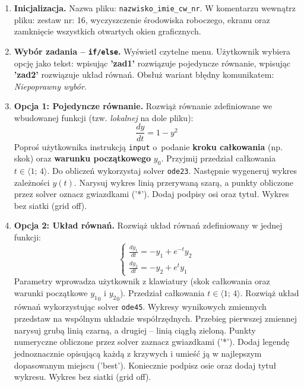 \documentclass[a4paper,11pt]{article}
\begin{document}
\begin{enumerate}[leftmargin=*, label=\textbf{\arabic*.}, itemsep=2pt]

  \item \textbf{Inicjalizacja.}
    Nazwa pliku: \texttt{nazwisko\_imie\_cw\_nr}. W komentarzu wewnątrz pliku: zestaw nr: 16, wyczyszczenie środowiska roboczego, ekranu oraz zamknięcie wszystkich otwartych okien graficznych.

  \item \textbf{Wybór zadania -- \texttt{if/else}.}
    Wyświetl czytelne menu. Użytkownik wybiera opcję jako tekst: wpisując \textbf{'zad1'} rozwiązuje pojedyncze równanie, wpisując \textbf{'zad2'} rozwiązuje układ równań. Obsłuż wariant błędny komunikatem: \textit{Niepoprawny wybór}.

  \item \textbf{Opcja 1: Pojedyncze równanie.}
    Rozwiąż równanie zdefiniowane we wbudowanej funkcji (tzw. \textit{lokalnej} na dole pliku):
    \[ \frac{dy}{dt} = 1 - y^2 \]
    Poproś użytkownika instrukcją \texttt{input} o~podanie \textbf{kroku całkowania} (np. skok) oraz \textbf{warunku początkowego} $y_0$. Przyjmij przedział całkowania $t \in \langle 1;\,4 \rangle$.
    Do obliczeń wykorzystaj solver \texttt{ode23}. Następnie wygeneruj wykres zależności $y(t)$. Narysuj wykres linią przerywaną szarą, a punkty obliczone przez solver oznacz gwiazdkami ('*'). Dodaj podpisy osi oraz tytuł. Wykres bez siatki (grid off).

  \item \textbf{Opcja 2: Układ równań.}
    Rozwiąż układ równań zdefiniowany w jednej funkcji:\\[-0.5em]
    \[
    \begin{cases}
      \frac{dy_1}{dt} = -y_1 + e^{-t}y_2 \\
      \frac{dy_2}{dt} = -y_2 + e^{t}y_1
    \end{cases}
    \]
    Parametry wprowadza użytkownik z klawiatury (skok całkowania oraz warunki początkowe $ {y_1}_{0} $ i $ {y_2}_{0} $). Przedział całkowania $t \in \langle 1;\,4 \rangle$.
    Rozwiąż układ równań wykorzystując solver \texttt{ode45}. Wykresy wynikowych zmiennych przedstaw na wspólnym układzie współrzędnych. Przebieg pierwszej zmiennej narysuj grubą linią czarną, a drugiej -- linią ciągłą zieloną. Punkty numeryczne obliczone przez solver zaznacz gwiazdkami ('*'). Dodaj legendę jednoznacznie opisującą każdą z krzywych i umieść ją w najlepszym dopasowanym miejscu ('best'). Koniecznie podpisz osie oraz dodaj tytuł wykresu. Wykres bez siatki (grid off).

\end{enumerate}
\end{document}
